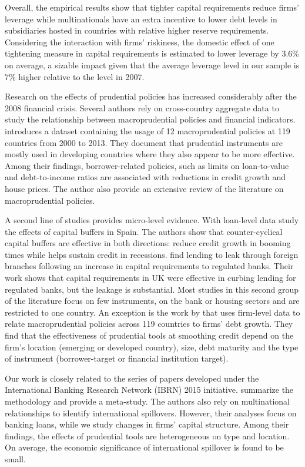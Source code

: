 \documentclass[12pt]{article}
\begin{document}
	Overall, the empirical results show that tighter capital requirements reduce firms' leverage while multinationals have an extra incentive to lower debt levels in subsidiaries hosted in countries with relative higher reserve requirements. Considering the interaction with firms' riskiness, the domestic effect of one tightening measure in capital requirements is estimated to lower leverage by 3.6\% on average, a sizable impact given that the average leverage level in our sample is 7\% higher relative to the level in 2007.
	
	Research on the effects of prudential policies has increased considerably after the 2008 financial crisis. Several authors rely on cross-country aggregate data to study the relationship between macroprudential policies and financial indicators. \cite*{cerutti2015use} introduces a dataset containing the usage of 12 macroprudential policies at 119 countries from 2000 to 2013. They document that prudential instruments are mostly used in developing countries where they also appear to be more effective. Among their findings, borrower-related policies, such as limits on loan-to-value and debt-to-income ratios are associated with reductions in credit growth and house prices. The author also provide an extensive review of the literature on macroprudential policies. 
	
	A second line of studies provides micro-level evidence. With loan-level data \cite*{jimenez2012macroprudential} study the  effects of capital buffers in Spain. The authors show that counter-cyclical capital buffers are effective in both directions: reduce credit growth in booming times while helps sustain credit in recessions. \cite*{aiyar2014does} find lending to leak through foreign branches following an increase in capital requirements to regulated banks. Their work shows that capital requirements in UK were effective in curbing lending for regulated banks, but the leakage is substantial. Most studies in this second group of the literature focus on few instruments, on the bank or housing sectors and are restricted to one country. An exception is the work by \cite*{ayyagari2017credit} that uses firm-level data to relate macroprudential policies across 119 countries to firms' debt growth. They find that the effectiveness of prudential tools at smoothing credit depend on the firm's location (emerging or developed country), size, debt maturity and the type of instrument (borrower-target or financial institution target). 
	
	Our work is closely related to the series of papers developed under the International Banking Research Network (IBRN) 2015 initiative. \cite*{buch2017cross} summarize the methodology and provide a meta-study. The authors also rely on multinational relationships to identify international spillovers. However, their analyses focus on banking loans, while we study changes in firms' capital structure. Among their findings, the effects of prudential tools are heterogeneous on type and location. On average, the economic significance of international spillover is found to be small.  
	
\end{document}

